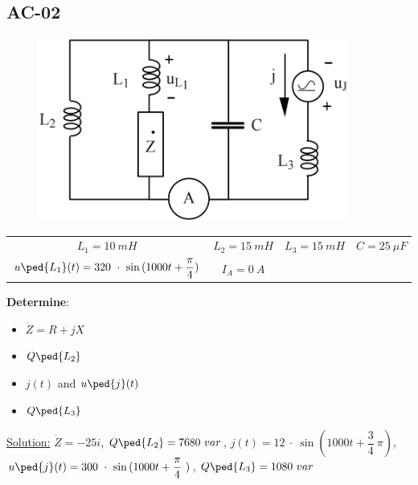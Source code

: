 \subsection{AC-02}
\begin{figure}[h]
\includegraphics[height=6cm]{img/2/02.png}
\centering
\end{figure}
\begin{center}
\begin{tabular}{ c c c c }
    $L_1 = 10\ mH $ & $L_2 = 15\ mH $ & $L_3 = 15\ mH $ & $C = 25\ \mu F$\\ $u\ped{L_1}(t) = 320\ \cdot\ \sin{(1000t + \dfrac{\pi}{4})}$ & $I_A = 0\ A$
\end{tabular}
\end{center}
\textbf{Determine}:
\begin{itemize}
  \item $\Dot{Z} = R + j X$
  \item $Q\ped{L_2}$
  \item $j(t)$ and  $u\ped{j}(t)$ 
  \item $Q\ped{L_3}$
\end{itemize}
\underline{\large{Solution:}}
\newline
$\Dot{Z} = -25i$, $Q\ped{L_2} = 7680\ var$, $j(t) = 12\ \cdot\ \sin{(1000t + \dfrac{3}{4}\ \pi )}$, $u\ped{j}(t) = 300\ \cdot\ \sin{(1000t + \dfrac{\pi}{4}\ )}$, $Q\ped{L_3} = 1080\ var$
